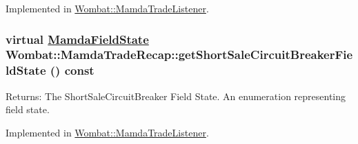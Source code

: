 Implemented in \hyperlink{classWombat_1_1MamdaTradeListener_9943001740bebfecd4801267dac6daca}{Wombat::Mamda\-Trade\-Listener}.\hypertarget{classWombat_1_1MamdaTradeRecap_6808f080463130d2426dad0cc2ba9c16}{
\subsubsection[getShortSaleCircuitBreakerFieldState]{\setlength{\rightskip}{0pt plus 5cm}virtual \hyperlink{namespaceWombat_93aac974f2ab713554fd12a1fa3b7d2a}{Mamda\-Field\-State} Wombat::Mamda\-Trade\-Recap::get\-Short\-Sale\-Circuit\-Breaker\-Field\-State () const}}
\label{classWombat_1_1MamdaTradeRecap_6808f080463130d2426dad0cc2ba9c16}


\begin{Desc}
\item[Returns:]The Short\-Sale\-Circuit\-Breaker Field State. An enumeration representing field state. \end{Desc}


Implemented in \hyperlink{classWombat_1_1MamdaTradeListener_2630b69a9a27a1772e3f4315c254a466}{Wombat::Mamda\-Trade\-Listener}.